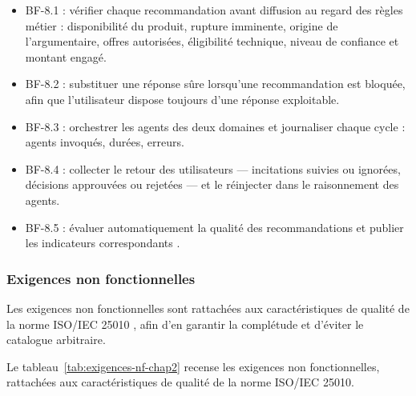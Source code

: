 \begin{itemize}[label=--]
    \item BF-8.1 : vérifier chaque recommandation avant diffusion au regard des règles métier : disponibilité du produit, rupture imminente, origine de l'argumentaire, offres autorisées, éligibilité technique, niveau de confiance et montant engagé.
    \item BF-8.2 : substituer une réponse sûre lorsqu'une recommandation est bloquée, afin que l'utilisateur dispose toujours d'une réponse exploitable.
    \item BF-8.3 : orchestrer les agents des deux domaines et journaliser chaque cycle : agents invoqués, durées, erreurs.
    \item BF-8.4 : collecter le retour des utilisateurs — incitations suivies ou ignorées, décisions approuvées ou rejetées — et le réinjecter dans le raisonnement des agents.
    \item BF-8.5 : évaluer automatiquement la qualité des recommandations et publier les indicateurs correspondants \cite{zheng2023judge,es2024ragas}.
\end{itemize}

\subsubsection{Exigences non fonctionnelles}

Les exigences non fonctionnelles sont rattachées aux caractéristiques de qualité de la norme ISO/IEC 25010 \cite{iso25010}, afin d'en garantir la complétude et d'éviter le catalogue arbitraire.

Le tableau~\ref{tab:exigences-nf-chap2} recense les exigences non fonctionnelles, rattachées aux caractéristiques de qualité de la norme ISO/IEC 25010.

